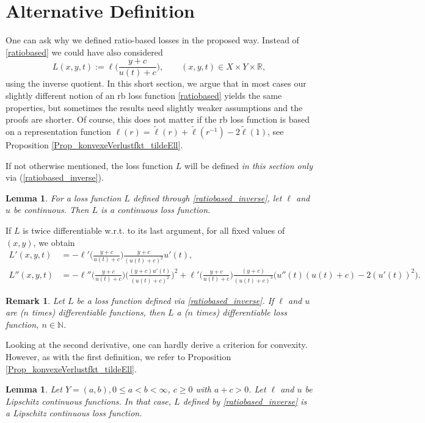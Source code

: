 \documentclass[10pt]{article}
\newcommand{\R}{\mathbb{R}}
\newcommand{\N}{\mathbb{N}}
\newcommand{\XY}{X \times Y}
\newtheorem{lemma}[theorem]{Lemma}
\newtheorem{remark}[theorem]{Remark}
\begin{document}
\section{Alternative Definition} \label{Kap_Alternative}
One can ask why we defined ratio-based losses in the proposed way.
Instead of \eqref{ratiobased} we could have also considered
\begin{equation} \label{ratiobased_inverse}
	L(x,y,t) := \ell\biggl(\frac{y+c}{u(t)+c}\biggr), \qquad (x,y,t) \in \XY \times \R, 
\end{equation}
using the inverse quotient. 
In this short section, we argue that in most cases our slightly different notion of an rb loss function \eqref{ratiobased} yields the same properties, but sometimes the results need slightly weaker assumptions and the proofs are shorter. Of course, this does not matter if the rb loss function is based on a representation function $\ell(r)=\widetilde{\ell}(r)+\widetilde{\ell}(r^{-1})-2\widetilde{\ell}(1)$, see
Proposition \ref{Prop_konvexeVerlustfkt_tildeEll}. \par 
If not otherwise mentioned, the loss function $L$ will be defined \emph{in this section only} via {(\ref{ratiobased_inverse})}. \par
\begin{lemma} \label{altLstetig}
	For a loss function $L$ defined through \eqref{ratiobased_inverse}, let $\ell$ and $u$ be continuous. Then $L$ is a continuous loss function.
\end{lemma}
If $L$ is twice differentiable  w.r.t. to its last argument, for all
fixed values of $(x,y)$, we obtain
\begin{align*}
	L'(x,y,t) &= -\ell'\biggl(\frac{y+c}{u(t)+c}\biggr) \frac{y+c}{(u(t)+c)^2} u'(t), \\
	L''(x,y,t) &= -\ell''\biggl(\frac{y+c}{u(t)+c}\biggr) \! \biggl(\frac{(y+c)u'(t)}{(u(t)+c)^2}\biggr)^{\!2} + \ell'\biggl(\frac{y+c}{u(t)+c}\biggr)\frac{(y+c)}{(u(t)+c)^3} \bigl(u''(t)(u(t)+c)-2(u'(t))^2\bigr).
\end{align*}
\begin{remark}
	Let $L$ be a loss function defined via \eqref{ratiobased_inverse}.
	If $\ell$ and $u$ are ($n$ times) differentiable functions, then $L$ a ($n$ times) differentiable loss function, $n \in \N$.
\end{remark}
Looking at the second derivative, one can hardly derive a criterion for convexity. 
However, as with the first definition, we refer to Proposition \ref{Prop_konvexeVerlustfkt_tildeEll}.
\begin{lemma} \label{altLLipschitz}
	Let $Y = (a,b), 0 \leq a < b < \infty$, $c \geq 0$ with $a+c>0$. 
	Let $\ell$ and $u$ be Lipschitz continuous functions. 
	In that case, $L$ defined by \eqref{ratiobased_inverse} is a Lipschitz continuous loss function. 
\end{lemma}
\end{document}
